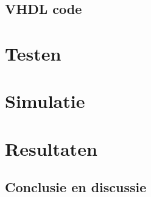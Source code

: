 \subsection{VHDL code}

\section{Testen}

\section{Simulatie}

\section{Resultaten}

\subsection{Conclusie en discussie}

